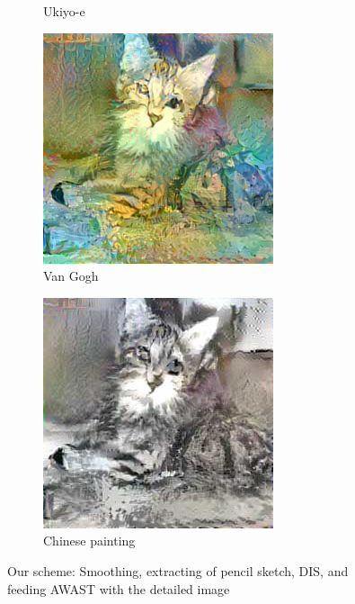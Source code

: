 \documentclass[10pt,twocolumn,letterpaper]{article}
\begin{document}
\begin{figure}
\begin{subfigure}[b]{0.18\textwidth}
    \caption{Ukiyo-e}
    \label{fig::base43}
  \end{subfigure}
  \begin{subfigure}[b]{0.18\textwidth}
    \includegraphics[width=\textwidth]{figure/baseline1/fg.jpg}
  \caption{Van Gogh}
    \label{fig::base44}
  \end{subfigure}
  \begin{subfigure}[b]{0.18\textwidth}
    \includegraphics[width=\textwidth]{figure/baseline1/chinese.jpg}
    \caption{Chinese painting}
    \label{fig::base45}
  \end{subfigure}
  \caption{Our scheme: Smoothing, extracting of pencil sketch, DIS, and feeding AWAST with the detailed image}
  \label{fig::sketchplus}
\end{figure}
\end{document}
